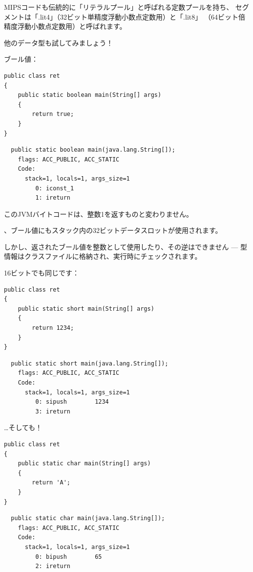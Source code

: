 MIPSコードも伝統的に「リテラルプール」と呼ばれる定数プールを持ち、
セグメントは「.lit4」（32ビット単精度浮動小数点定数用）と「.lit8」
（64ビット倍精度浮動小数点定数用）と呼ばれます。

他のデータ型も試してみましょう！

ブール値：

\begin{lstlisting}[style=customjava]
public class ret
{
	public static boolean main(String[] args) 
	{
		return true;
	}
}
\end{lstlisting}

\begin{lstlisting}
  public static boolean main(java.lang.String[]);
    flags: ACC_PUBLIC, ACC_STATIC
    Code:
      stack=1, locals=1, args_size=1
         0: iconst_1      
         1: ireturn       
\end{lstlisting}

このJVMバイトコードは、整数1を返すものと変わりません。

、ブール値にもスタック内の32ビットデータスロットが使用されます。

しかし、返されたブール値を整数として使用したり、その逆はできません --- 型情報はクラスファイルに格納され、実行時にチェックされます。

16ビットでも同じです：

\begin{lstlisting}[style=customjava]
public class ret
{
	public static short main(String[] args) 
	{
		return 1234;
	}
}
\end{lstlisting}

\begin{lstlisting}
  public static short main(java.lang.String[]);
    flags: ACC_PUBLIC, ACC_STATIC
    Code:
      stack=1, locals=1, args_size=1
         0: sipush        1234
         3: ireturn       
\end{lstlisting}

\dots そしても！

\begin{lstlisting}[style=customjava]
public class ret
{
	public static char main(String[] args) 
	{
		return 'A';
	}
}
\end{lstlisting}

\begin{lstlisting}
  public static char main(java.lang.String[]);
    flags: ACC_PUBLIC, ACC_STATIC
    Code:
      stack=1, locals=1, args_size=1
         0: bipush        65
         2: ireturn       
\end{lstlisting}

